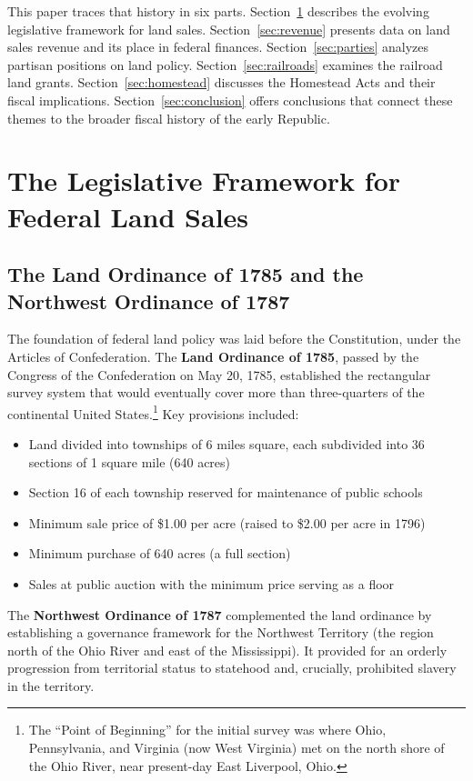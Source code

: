 \documentclass[12pt]{article}
\begin{document}
This paper traces that history in six parts.  Section~\ref{sec:framework} describes the evolving legislative framework for land sales.  Section~\ref{sec:revenue} presents data on land sales revenue and its place in federal finances.  Section~\ref{sec:parties} analyzes partisan positions on land policy.  Section~\ref{sec:railroads} examines the railroad land grants.  Section~\ref{sec:homestead} discusses the Homestead Acts and their fiscal implications.  Section~\ref{sec:conclusion} offers conclusions that connect these themes to the broader fiscal history of the early Republic.


\section{The Legislative Framework for Federal Land Sales}\label{sec:framework}

\subsection{The Land Ordinance of 1785 and the Northwest Ordinance of 1787}

The foundation of federal land policy was laid before the Constitution, under the Articles of Confederation.  The \textbf{Land Ordinance of 1785}, passed by the Congress of the Confederation on May 20, 1785, established the rectangular survey system that would eventually cover more than three-quarters of the continental United States.\footnote{The ``Point of Beginning'' for the initial survey was where Ohio, Pennsylvania, and Virginia (now West Virginia) met on the north shore of the Ohio River, near present-day East Liverpool, Ohio.}  Key provisions included:

\begin{itemize}
\item Land divided into townships of 6 miles square, each subdivided into 36 sections of 1 square mile (640 acres)
\item Section 16 of each township reserved for maintenance of public schools
\item Minimum sale price of \$1.00 per acre (raised to \$2.00 per acre in 1796)
\item Minimum purchase of 640 acres (a full section)
\item Sales at public auction with the minimum price serving as a floor
\end{itemize}

The \textbf{Northwest Ordinance of 1787} complemented the land ordinance by establishing a governance framework for the Northwest Territory (the region north of the Ohio River and east of the Mississippi).  It provided for an orderly progression from territorial status to statehood and, crucially, prohibited slavery in the territory.
\end{document}
